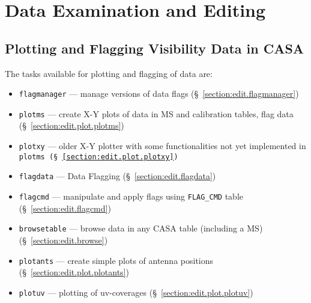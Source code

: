 




\chapter{Data Examination and Editing}
\label{chapter:edit}

\section{Plotting and Flagging Visibility Data in CASA}
\label{section:edit.intro}

The tasks available for plotting and flagging of data are:
\begin{itemize}
   \item {\tt flagmanager} --- manage versions of data flags
      (\S~\ref{section:edit.flagmanager})
   \item {\tt plotms} --- create X-Y plots of data in MS and
     calibration tables, flag data
      (\S~\ref{section:edit.plot.plotms})
   \item {\tt plotxy} --- older X-Y plotter with some functionalities not yet implemented in \tt{plotms}
      (\S~\ref{section:edit.plot.plotxy})
    \item {\tt flagdata} --- Data Flagging 
      (\S~\ref{section:edit.flagdata})
   \item {\tt flagcmd} --- manipulate and apply flags using {\tt FLAG\_CMD} table
      (\S~\ref{section:edit.flagcmd})
  \item {\tt browsetable} --- browse data in any CASA table (including a MS)
      (\S~\ref{section:edit.browse})
   \item {\tt plotants} --- create simple plots of antenna positions
      (\S~\ref{section:edit.plot.plotants})
  \item {\tt plotuv} --- plotting of uv-coverages
      (\S~\ref{section:edit.plot.plotuv})
\end{itemize}


